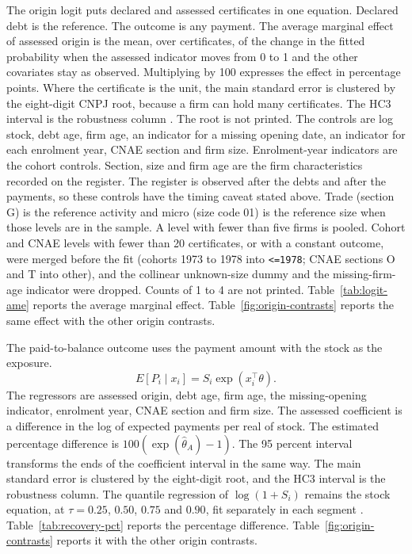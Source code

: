 The origin logit puts declared and assessed certificates in one equation.
Declared debt is the reference.
The outcome is any payment.
The average marginal effect of assessed origin is the mean, over certificates, of the change in the fitted probability when the assessed indicator moves from 0 to 1 and the other covariates stay as observed.
Multiplying by 100 expresses the effect in percentage points.
Where the certificate is the unit, the main standard error is clustered by the eight-digit CNPJ root, because a firm can hold many certificates.
The HC3 interval is the robustness column \citep{mackinnon1985}.
The root is not printed.
The controls are log stock, debt age, firm age, an indicator for a missing opening date, an indicator for each enrolment year, CNAE section and firm size.
Enrolment-year indicators are the cohort controls.
Section, size and firm age are the firm characteristics recorded on the register.
The register is observed after the debts and after the payments, so these controls have the timing caveat stated above.
Trade (section G) is the reference activity and micro (size code 01) is the reference size when those levels are in the sample.
A level with fewer than five firms is pooled.
Cohort and CNAE levels with fewer than 20 certificates, or with a constant outcome, were merged before the fit (cohorts 1973 to 1978 into \texttt{<=1978}; CNAE sections O and T into other), and the collinear unknown-size dummy and the missing-firm-age indicator were dropped.
Counts of 1 to 4 are not printed.
Table~\ref{tab:logit-ame} reports the average marginal effect.
Table~\ref{fig:origin-contrasts} reports the same effect with the other origin contrasts.

The paid-to-balance outcome uses the payment amount with the stock as the exposure.
\begin{equation}
E[P_i \mid x_i] = S_i \exp(x_i^{\top}\theta).
\label{eq:ppml}
\end{equation}
The regressors are assessed origin, debt age, firm age, the missing-opening indicator, enrolment year, CNAE section and firm size.
The assessed coefficient is a difference in the log of expected payments per real of stock.
The estimated percentage difference is $100(\exp(\hat\theta_A)-1)$.
The 95 percent interval transforms the ends of the coefficient interval in the same way.
The main standard error is clustered by the eight-digit root, and the HC3 interval is the robustness column.
The quantile regression of $\log(1+S_i)$ remains the stock equation, at $\tau = 0.25$, $0.50$, $0.75$ and $0.90$, fit separately in each segment \citep{koenker1978,koenker2001quantile}.
Table~\ref{tab:recovery-pct} reports the percentage difference.
Table~\ref{fig:origin-contrasts} reports it with the other origin contrasts.

